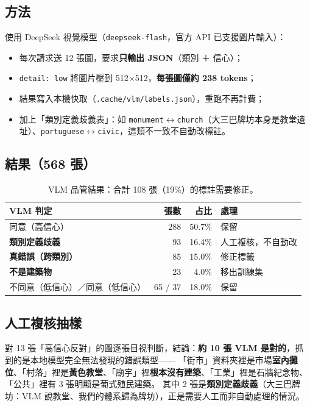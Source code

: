 \documentclass[11pt,a4paper,fontset=windows]{ctexart}
\begin{document}
\subsection{方法}
使用 DeepSeek 視覺模型（\texttt{deepseek-flash}，官方 API 已支援圖片輸入）：
\begin{itemize}[leftmargin=1.4em,itemsep=1pt]
  \item 每次請求送 12 張圖，要求\textbf{只輸出 JSON}（類別 ＋ 信心）；
  \item \texttt{detail: low} 將圖片壓到 512$\times$512，\textbf{每張圖僅約 238 tokens}；
  \item 結果寫入本機快取（\texttt{.cache/vlm/labels.json}），重跑不再計費；
  \item 加上「類別定義歧義表」：如 \texttt{monument}$\leftrightarrow$\texttt{church}（大三巴牌坊本身是教堂遺址）、\texttt{portuguese}$\leftrightarrow$\texttt{civic}，這類不一致不自動改標註。
\end{itemize}

\subsection{結果（568 張）}
\begin{table}[H]
\centering\small
\begin{tabular}{@{}lrrl@{}}
\toprule
\textbf{VLM 判定} & \textbf{張數} & \textbf{占比} & \textbf{處理} \\
\midrule
同意（高信心） & 288 & 50.7\% & 保留 \\
\textbf{類別定義歧義} & 93 & 16.4\% & 人工複核，不自動改 \\
\textbf{真錯誤（跨類別）} & 85 & 15.0\% & 修正標籤 \\
\textbf{不是建築物} & 23 & 4.0\% & 移出訓練集 \\
不同意（低信心）／同意（低信心） & 65 / 37 & 18.0\% & 保留 \\
\bottomrule
\end{tabular}
\caption{VLM 品管結果：合計 108 張（19\%）的標註需要修正。}
\end{table}

\subsection{人工複核抽樣}
對 13 張「高信心反對」的圖逐張目視判斷，結論：\textbf{約 10 張 VLM 是對的}，抓到的是本地模型完全無法發現的錯誤類型——
「街市」資料夾裡是市場\textbf{室內攤位}、「村落」裡是\textbf{黃色教堂}、「廟宇」裡\textbf{根本沒有建築}、「工業」裡是石牆紀念物、「公共」裡有 3 張明顯是葡式殖民建築。
其中 2 張是\textbf{類別定義歧義}（大三巴牌坊：VLM 說教堂、我們的體系歸為牌坊），正是需要人工而非自動處理的情況。
\end{document}
